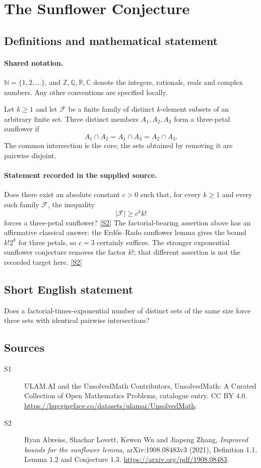 \documentclass[11pt]{article}
\newcommand{\sref}[2]{\hyperlink{source:#1:#2}{[S#2]}}
\begin{document}
\section{The Sunflower Conjecture}\label{statement}

\subsection{Definitions and mathematical statement}

\paragraph{Shared notation.}$\mathbb N=\{1,2,\ldots\}$, and $\mathbb Z,\mathbb Q,\mathbb R,\mathbb C$ denote the integers, rationals, reals and complex numbers. Any other conventions are specified locally.


Let $k\geq1$ and let $\mathcal F$ be a finite family of distinct $k$-element subsets of an arbitrary finite set. Three distinct members $A_1,A_2,A_3$ form a three-petal sunflower if
\[
A_1\cap A_2=A_1\cap A_3=A_2\cap A_3.
\]
The common intersection is the core; the sets obtained by removing it are pairwise disjoint.
\paragraph{Statement recorded in the supplied source.}
Does there exist an absolute constant $c>0$ such that, for every $k\geq1$ and every such family $\mathcal F$, the inequality
\[
|\mathcal F|\geq c^k k!
\]
forces a three-petal sunflower? \sref{statement}{2}
The factorial-bearing assertion above has an affirmative classical answer: the Erd\H{o}s--Rado sunflower lemma gives the bound $k!2^k$ for three petals, so $c=3$ certainly suffices. The stronger exponential sunflower conjecture removes the factor $k!$; that different assertion is not the recorded target here. \sref{statement}{2}
\subsection{Short English statement}
Does a factorial-times-exponential number of distinct sets of the same size force three sets with identical pairwise intersections?
\subsection{Sources}
\begin{description}
\item[\hypertarget{source:statement:1}{S1}] ULAM.AI and the UnsolvedMath Contributors, UnsolvedMath: A Curated Collection of Open Mathematics Problems, catalogue entry. CC BY 4.0. \url{https://huggingface.co/datasets/ulamai/UnsolvedMath}.
\item[\hypertarget{source:statement:2}{S2}] Ryan Alweiss, Shachar Lovett, Kewen Wu and Jiapeng Zhang, \emph{Improved bounds for the sunflower lemma}, arXiv:1908.08483v3 (2021), Definition 1.1, Lemma 1.2 and Conjecture 1.3. \url{https://arxiv.org/pdf/1908.08483}.
\end{description}
\label{end:statement}
\end{document}
